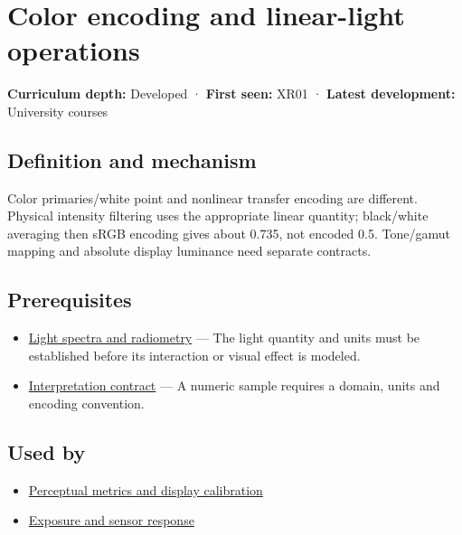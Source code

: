 \hypertarget{appendix-a9f83ad40792}{}\label{referencestart:appendix-a9f83ad40792}
\section{Color encoding and linear-light operations}\label{appendix-a9f83ad40792-color-encoding-and-linear-light-operations}

\textbf{Curriculum depth:} Developed · \textbf{First seen:} XR01 · \textbf{Latest development:} University courses

\subsection{Definition and mechanism}\label{appendix-a9f83ad40792-definition-and-mechanism}

Color primaries/white point and nonlinear transfer encoding are different. Physical intensity filtering uses the appropriate linear quantity; black/white averaging then sRGB encoding gives about 0.735, not encoded 0.5. Tone/gamut mapping and absolute display luminance need separate contracts.

\subsection{Prerequisites}\label{appendix-a9f83ad40792-prerequisites}

\begin{itemize}
\tightlist
\item
  \hyperref[appendix-215c2570199b]{Light spectra and radiometry} --- The light quantity and units must be established before its interaction or visual effect is modeled.
\item
  \hyperref[appendix-f414bd4ed05c]{Interpretation contract} --- A numeric sample requires a domain, units and encoding convention.
\end{itemize}

\subsection{Used by}\label{appendix-a9f83ad40792-used-by}

\begin{itemize}
\tightlist
\item
  \hyperref[appendix-b2c1846508bf]{Perceptual metrics and display calibration}
\item
  \hyperref[appendix-92d45cdf2afc]{Exposure and sensor response}
\end{itemize}

